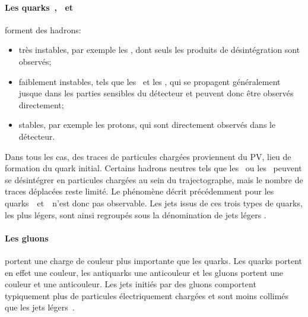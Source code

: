 \paragraph{Les quarks~\quarkd, \quarku\ et~\quarks} forment des hadrons:
\begin{itemize}
\item très instables, par exemple les \pionnull, dont seuls les produits de désintégration sont observés;
\item faiblement instables, tels que les \Kaonplus\ et les \Kaonnull, qui se propagent généralement jusque dans les parties sensibles du détecteur et peuvent donc être observés directement;
\item stables, par exemple les protons, qui sont directement observés dans le détecteur.
\end{itemize}
Dans tous les cas, des traces de particules chargées proviennent du PV, lieu de formation du quark initial.
Certains hadrons neutres tels que les \Lambdabaryonnull\ ou les \Kaonnull\ peuvent se désintégrer en particules chargées au sein du trajectographe, mais le nombre de traces déplacées reste limité.
Le phénomène décrit précédemment pour les quarks~\quarkb\ et~\quarkc\ n'est donc pas observable.
Les jets issus de ces trois types de quarks, les plus légers, sont ainsi regroupés sous la dénomination de \og jets légers \fg.
\paragraph{Les gluons} portent une charge de couleur plus importante que les quarks.
Les quarks portent en effet une couleur, les antiquarks une anticouleur et les gluons portent une couleur et une anticouleur.
Les jets initiés par des gluons comportent typiquement plus de particules électriquement chargées et sont moins collimés que les jets légers~\cite{CMS-PAS-JME-13-002}.